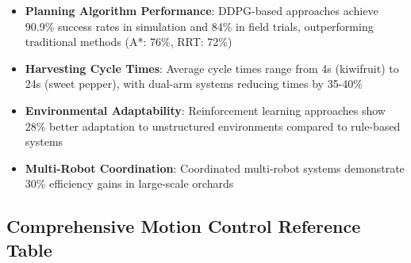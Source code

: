 \documentclass[a4paper,fleqn]{cas-dc}
\begin{document}
\begin{itemize}
\item \textbf{Planning Algorithm Performance}: DDPG-based approaches achieve 90.9\% success rates in simulation and 84\% in field trials, outperforming traditional methods (A*: 76\%, RRT: 72\%)

\item \textbf{Harvesting Cycle Times}: Average cycle times range from 4s (kiwifruit) to 24s (sweet pepper), with dual-arm systems reducing times by 35-40\%

\item \textbf{Environmental Adaptability}: Reinforcement learning approaches show 28\% better adaptation to unstructured environments compared to rule-based systems

\item \textbf{Multi-Robot Coordination}: Coordinated multi-robot systems demonstrate 30\% efficiency gains in large-scale orchards
\end{itemize}

\subsection{Comprehensive Motion Control Reference Table}
\end{document}
